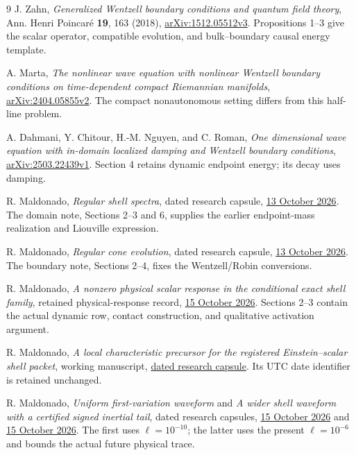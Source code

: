 \documentclass[11pt]{article}
\begin{document}
\begin{thebibliography}{9}
J. Zahn, \emph{Generalized Wentzell boundary conditions and quantum field theory},
Ann. Henri Poincar\'e \textbf{19}, 163 (2018),
\href{https://arxiv.org/abs/1512.05512v3}{arXiv:1512.05512v3}.
Propositions 1--3 give the scalar operator, compatible evolution,
and bulk--boundary causal energy template.

A. Marta, \emph{The nonlinear wave equation with nonlinear Wentzell
boundary conditions on time-dependent compact Riemannian manifolds},
\href{https://arxiv.org/abs/2404.05855v2}{arXiv:2404.05855v2}.
The compact nonautonomous setting differs from this half-line problem.

A. Dahmani, Y. Chitour, H.-M. Nguyen, and C. Roman,
\emph{One dimensional wave equation with in-domain localized damping and
Wentzell boundary conditions},
\href{https://arxiv.org/abs/2503.22439v1}{arXiv:2503.22439v1}.
Section 4 retains dynamic endpoint energy; its decay uses damping.

R. Maldonado, \emph{Regular shell spectra}, dated research capsule,
\href{https://github.com/maldonado-research/HDblast/tree/main/research/HDBLAST_REGULAR_SHELL_SPECTRA_20261013}{13 October 2026}.
The domain note, Sections 2--3 and 6, supplies the earlier endpoint-mass
realization and Liouville expression.

R. Maldonado, \emph{Regular cone evolution}, dated research capsule,
\href{https://github.com/maldonado-research/HDblast/tree/main/research/HDBLAST_REGULAR_CONE_EVOLUTION_20261013}{13 October 2026}.
The boundary note, Sections 2--4, fixes the Wentzell/Robin conversions.

R. Maldonado, \emph{A nonzero physical scalar response in the conditional
exact shell family}, retained physical-response record,
\href{https://github.com/maldonado-research/HDblast/blob/main/research/HDBLAST_INTERIOR_MASTER_JETS_20261015/inputs/reference/PHYSICAL_SHELL_RESPONSE.md}{15 October 2026}.
Sections 2--3 contain the actual dynamic row, contact construction,
and qualitative activation argument.

R. Maldonado, \emph{A local characteristic precursor for the registered
Einstein--scalar shell packet}, working manuscript,
\href{https://github.com/maldonado-research/HDblast/tree/main/research/HDBLAST_PAST_CHARACTERISTIC_PRECURSOR_20261105}{dated research capsule}.
Its UTC date identifier is retained unchanged.

R. Maldonado, \emph{Uniform first-variation waveform} and
\emph{A wider shell waveform with a certified signed inertial tail},
dated research capsules,
\href{https://github.com/maldonado-research/HDblast/tree/main/research/HDBLAST_UNIFORM_FIRST_VARIATION_WAVEFORM_20261015}{15 October 2026}
and
\href{https://github.com/maldonado-research/HDblast/tree/main/research/HDBLAST_INERTIAL_SHELL_WAVEFORM_20261015}{15 October 2026}.
The first uses $\ell=10^{-10}$; the latter uses the present
$\ell=10^{-6}$ and bounds the actual future physical trace.
\end{thebibliography}
\end{document}
